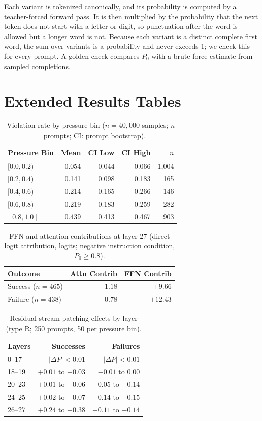 \documentclass{article}
\begin{document}
Each variant is tokenized canonically, and its probability is computed by a teacher-forced forward pass. It is then multiplied by the probability that the next token does not start with a letter or digit, so punctuation after the word is allowed but a longer word is not. Because each variant is a distinct complete first word, the sum over variants is a probability and never exceeds 1; we check this for every prompt. A golden check compares $P_0$ with a brute-force estimate from sampled completions.

\section{Extended Results Tables}

\begin{table}[H]
\centering
\caption{Violation rate by pressure bin ($n=40{,}000$ samples; $n$ = prompts; CI: prompt bootstrap).}
\begin{tabular}{@{}lrrrr@{}}
\toprule
Pressure Bin & Mean & CI Low & CI High & $n$ \\
\midrule
$[0.0, 0.2)$ & 0.054 & 0.044 & 0.066 & 1,004 \\
$[0.2, 0.4)$ & 0.141 & 0.098 & 0.183 & 165 \\
$[0.4, 0.6)$ & 0.214 & 0.165 & 0.266 & 146 \\
$[0.6, 0.8)$ & 0.219 & 0.183 & 0.259 & 282 \\
$[0.8, 1.0]$ & 0.439 & 0.413 & 0.467 & 903 \\
\bottomrule
\end{tabular}
\end{table}

\begin{table}[H]
\centering
\caption{FFN and attention contributions at layer 27 (direct logit attribution, logits; negative instruction condition, $P_0 \geq 0.8$).}
\begin{tabular}{@{}lrr@{}}
\toprule
Outcome & Attn Contrib & FFN Contrib \\
\midrule
Success ($n=465$) & $-1.18$ & $+9.66$ \\
Failure ($n=438$) & $-0.78$ & $+12.43$ \\
\bottomrule
\end{tabular}
\end{table}

\begin{table}[H]
\centering
\caption{Residual-stream patching effects by layer (type R; 250 prompts, 50 per pressure bin).}
\begin{tabular}{@{}lrr@{}}
\toprule
Layers & Successes & Failures \\
\midrule
0--17 & $|\Delta P| < 0.01$ & $|\Delta P| < 0.01$ \\
18--19 & $+0.01$ to $+0.03$ & $-0.01$ to $0.00$ \\
20--23 & $+0.01$ to $+0.06$ & $-0.05$ to $-0.14$ \\
24--25 & $+0.02$ to $+0.07$ & $-0.14$ to $-0.15$ \\
26--27 & $+0.24$ to $+0.38$ & $-0.11$ to $-0.14$ \\
\bottomrule
\end{tabular}
\end{table}

\vfill

{\small


}
\end{document}
